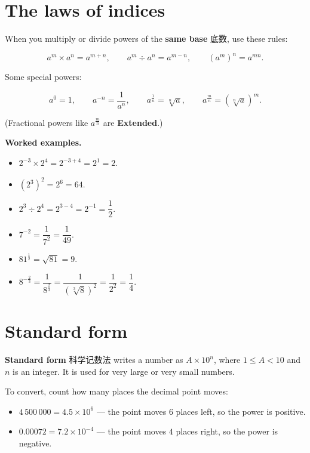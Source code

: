\documentclass[11pt]{article}
\begin{document}
\section*{The laws of indices}

When you multiply or divide powers of the \textbf{same base} 底数, use these rules:

\[
a^{m} \times a^{n} = a^{m+n}, \qquad a^{m} \div a^{n} = a^{m-n}, \qquad (a^{m})^{n} = a^{mn}.
\]

Some special powers:

\[
a^{0} = 1, \qquad a^{-n} = \frac{1}{a^{n}}, \qquad a^{\frac{1}{n}} = \sqrt[n]{a}, \qquad a^{\frac{m}{n}} = \left(\sqrt[n]{a}\right)^{m}.
\]

(Fractional powers like $a^{\frac{m}{n}}$ are \textbf{Extended}.)

\textbf{Worked examples.}

\begin{itemize}
\item $2^{-3} \times 2^{4} = 2^{-3+4} = 2^{1} = 2.$

\item $(2^{3})^{2} = 2^{6} = 64.$

\item $2^{3} \div 2^{4} = 2^{3-4} = 2^{-1} = \dfrac{1}{2}.$

\item $7^{-2} = \dfrac{1}{7^{2}} = \dfrac{1}{49}.$

\item $81^{\frac{1}{2}} = \sqrt{81} = 9.$

\item $8^{-\frac{2}{3}} = \dfrac{1}{8^{\frac{2}{3}}} = \dfrac{1}{\left(\sqrt[3]{8}\right)^{2}} = \dfrac{1}{2^{2}} = \dfrac{1}{4}.$

\end{itemize}

\section*{Standard form}

\textbf{Standard form} 科学记数法 writes a number as $A \times 10^{n}$, where $1 \leqslant A < 10$ and $n$ is an integer. It is used for very large or very small numbers.

To convert, count how many places the decimal point moves:

\begin{itemize}
\item $4\,500\,000 = 4.5 \times 10^{6}$ — the point moves $6$ places left, so the power is positive.

\item $0.00072 = 7.2 \times 10^{-4}$ — the point moves $4$ places right, so the power is negative.

\end{itemize}
\end{document}

